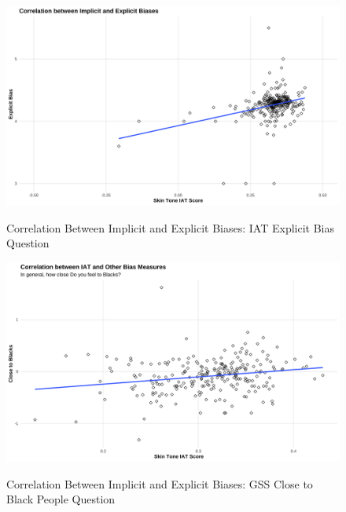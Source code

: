 \documentclass[12pt, fullpage]{article}
\begin{document}
\newpage
\pagebreak

\begin{center}
\begin{figure}[H]
\caption{Correlation Between Implicit and Explicit Biases: IAT Explicit Bias Question}
\includegraphics[width=\textwidth]{figure/ImplicitExplicit_scatter.png} 
\label{fig:cor-bias-expl}
\end{figure}
\end{center}

\newpage
\pagebreak

\begin{center}
\begin{figure}[H]
\caption{Correlation Between Implicit and Explicit Biases: GSS Close to Black People Question}
\includegraphics[width=\textwidth]{figure/ImplicitCloseBlk_scatter} 
\label{fig:cor-bias-gss}
\end{figure}
\end{center}

\newpage
\pagebreak
\end{document}
